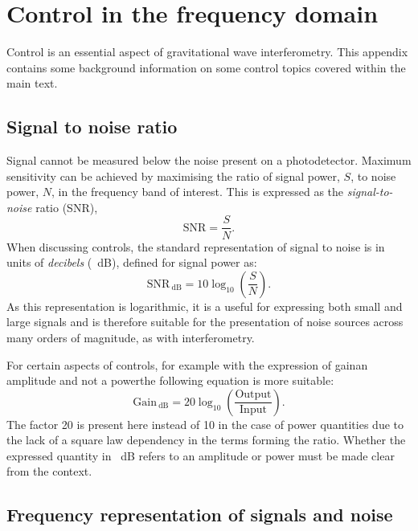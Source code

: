 \chapter{\label{a:control}Control in the frequency domain}
Control is an essential aspect of gravitational wave interferometry. This appendix contains some background information on some control topics covered within the main text.

\section{\label{sec:snr}Signal to noise ratio}
Signal cannot be measured below the noise present on a photodetector. Maximum sensitivity can be achieved by maximising the ratio of signal power, $S$, to noise power, $N$, in the frequency band of interest. This is expressed as the \emph{signal-to-noise} ratio (SNR),
\begin{equation}
  \text{SNR} = \frac{S}{N}.
\end{equation}
When discussing controls, the standard representation of signal to noise is in units of \emph{decibels} (\SI{}{\deci\bel}), defined for signal power as:
\begin{equation}
  \text{SNR}_{\SI{}{\deci\bel}} = 10 \log_{10} \left( \frac{S}{N} \right).
\end{equation}
As this representation is logarithmic, it is a useful for expressing both small and large signals and is therefore suitable for the presentation of noise sources across many orders of magnitude, as with interferometry.

For certain aspects of controls, for example with the expression of gain\textemdash an amplitude and not a power\textemdash the following equation is more suitable:
\begin{equation}
  \text{Gain}_{\SI{}{\deci\bel}} = 20 \log_{10} \left( \frac{\text{Output}}{\text{Input}} \right).
\end{equation}
The factor \num{20} is present here instead of \num{10} in the case of power quantities due to the lack of a square law dependency in the terms forming the ratio. Whether the expressed quantity in \SI{}{\deci\bel} refers to an amplitude or power must be made clear from the context.

\section{\label{sec:freq-resp-signals}Frequency representation of signals and noise}
